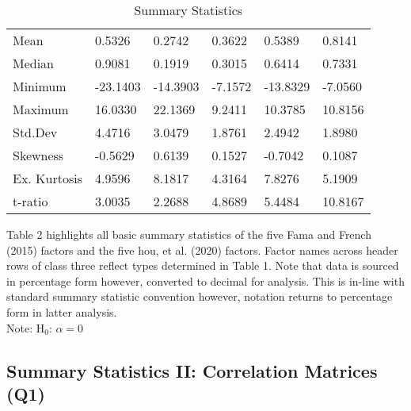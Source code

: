\documentclass[11pt, english]{article}
\begin{document}
\begin{table}[h]
\begin{center}
\begin{tabular}{ p{2cm} p{1.5cm} p{1.5cm} p{1.5cm} p{1.5cm} p{1.5cm} }
	Mean & 0.5326 & 0.2742 & 0.3622 & 0.5389 & 0.8141\\ 
	Median & 0.9081 & 0.1919 & 0.3015 & 0.6414 & 0.7331\\
	Minimum & -23.1403 & -14.3903 & -7.1572 & -13.8329 & -7.0560\\
	Maximum & 16.0330 & 22.1369 & 9.2411 & 10.3785 & 10.8156\\
	Std.Dev & 4.4716 & 3.0479 & 1.8761 & 2.4942 & 1.8980\\
        Skewness & -0.5629 & 0.6139 & 0.1527 & -0.7042 & 0.1087\\
        Ex. Kurtosis & 4.9596 & 8.1817 & 4.3164 & 7.8276 & 5.1909\\
        t-ratio & 3.0035 & 2.2688 & 4.8689 & 5.4484 & 10.8167\\ 
        \hline
\end{tabular}
        \caption{Summary Statistics} 
\end{center}
\end{table}

Table 2 highlights all basic summary statistics of the five Fama and French (2015) factors and the five hou, et al. (2020) factors. Factor names across header rows of class three reflect types determined in Table 1. Note that data is sourced in percentage form however, converted to decimal for analysis. This is in-line with standard summary statistic convention however, notation returns to percentage form in latter analysis.\\ 

Note: $\mathrm{H_0}$: $\alpha=0$

\newpage

	\subsection{Summary Statistics II: Correlation Matrices (Q1)}
\end{document}

